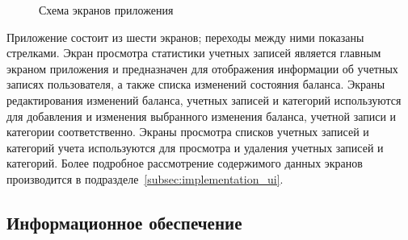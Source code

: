 \begin{figure}[h!]
  \centering
  \caption{Схема экранов приложения}
  \label{fig:design_activities}
\end{figure}

Приложение состоит из шести экранов; переходы между ними показаны стрелками.
Экран просмотра статистики учетных записей является главным экраном приложения
и предназначен для отображения информации об учетных записях пользователя,
а также списка изменений состояния баланса.
Экраны редактирования изменений баланса, учетных записей и категорий
используются для добавления и изменения выбранного изменения баланса,
учетной записи и категории соответственно.
Экраны просмотра списков учетных записей и категорий учета используются
для просмотра и удаления учетных записей и категорий.
Более подробное рассмотрение содержимого данных экранов производится
в подразделе~\ref{subsec:implementation_ui}.

\subsection{Информационное обеспечение}
\label{subsec:design_information}

